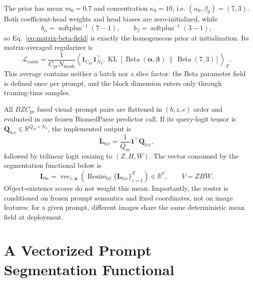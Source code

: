 \documentclass[10pt]{article}
\newcommand{\R}{\mathbb{R}}
\newcommand{\cL}{\mathcal{L}}
\newcommand{\ones}{\bm{1}}
\newcommand{\Resize}{\operatorname{Resize}}
\newcommand{\softplus}{\operatorname{softplus}}
\newcommand{\KL}{\operatorname{KL}}
\newcommand{\balpha}{\bm{\alpha}}
\newcommand{\bbeta}{\bm{\beta}}
\begin{document}
The prior has mean $m_0=0.7$ and concentration $\kappa_0=10$, i.e.
$(\alpha_0,\beta_0)=(7,3)$.  Both coefficient-head weights and head biases are
zero-initialized, while
\begin{equation}
 b_\alpha=\softplus^{-1}(7-1),\qquad
 b_\beta=\softplus^{-1}(3-1),
\end{equation}
so Eq.~\eqref{eq:matrix-beta-field} is exactly the homogeneous prior at
initialization.  Its matrix-averaged
regularizer is
\begin{equation}
    \cL_{\mathrm{route}}
    =\frac{1}{C_{\mathrm{pr}}N_{\mathrm{mask}}}
      \left\langle\ones_{C_{\mathrm{pr}}}\ones_{N_0}^\top,
      \KL\!\left[
       \operatorname{Beta}(\balpha,\bbeta)
       \,\|\,\operatorname{Beta}(7,3)
      \right]\right\rangle_F.
    \label{eq:matrix-route-kl}
\end{equation}
This average contains neither a batch nor a slice factor: the Beta parameter
field is defined once per prompt, and the block dimension enters only through
training-time samples.

All $BZC_{\mathrm{pr}}$ fused visual--prompt pairs are flattened in $(b,z,c)$
order and evaluated in one frozen BiomedParse predictor call.  If its query-logit tensor is
$\bm Q_{bzc}\in\R^{Q_m\times N_o}$, the implemented output is
\begin{equation}
    \bm L_{bzc}
    =\frac{1}{Q_m}\ones^\top\bm Q_{bzc},
    \label{eq:matrix-query-mean}
\end{equation}
followed by trilinear logit resizing to $(Z,H,W)$.  The vector consumed by the
segmentation functional below is
\begin{equation}
 \bm L_{bc}=\operatorname{vec}_{z,\bm u}\!\left(
   \Resize_{\mathrm{tri}}\{\bm L_{bzc}\}_{z=1}^{Z}
   \right)\in\R^{V},\qquad V=ZHW.
\end{equation}
Object-existence scores do
not weight this mean.  Importantly, the router is conditioned on frozen prompt
semantics and fixed coordinates, not on image features: for a given prompt,
different images share the same deterministic mean field at deployment.

\section{A Vectorized Prompt Segmentation Functional}
\end{document}
